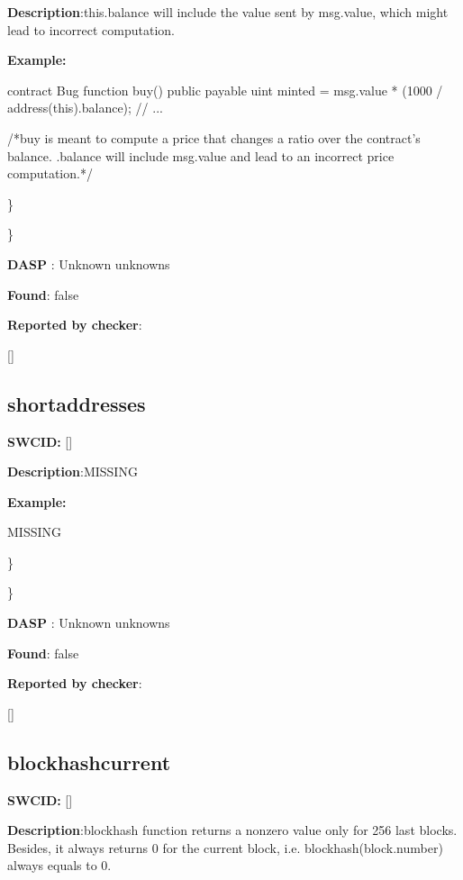 \documentclass{article}
\begin{document}
\textbf{Description}:this.balance will include the value sent by msg.value, which might lead to incorrect computation.


\textbf{Example:} 
\begin{ffcode} 

contract Bug{
  function buy() public payable{
    uint minted = msg.value * (1000 / address(this).balance);
    // ...
  }
}

 /*buy is meant to compute a price that changes a ratio over the contract's balance. .balance will include msg.value and lead to an incorrect price computation.*/ 

\end{ffcode} 
\} 

\} 

\textbf{DASP} : Unknown unknowns

\textbf{Found}: false

\textbf{Reported by checker}: 
\begin{ffcode} 

[]
\end{ffcode} 
\subsection{short{\textunderscore}addresses} 
\textbf{SWC{\textunderscore}ID:} []

\textbf{Description}:MISSING


\textbf{Example:} 
\begin{ffcode} 

MISSING

\end{ffcode} 
\} 

\} 

\textbf{DASP} : Unknown unknowns

\textbf{Found}: false

\textbf{Reported by checker}: 
\begin{ffcode} 

[]
\end{ffcode} 
\subsection{blockhash{\textunderscore}current} 
\textbf{SWC{\textunderscore}ID:} []

\textbf{Description}:blockhash function returns a non{\textendash}zero value only for 256 last blocks. Besides, it always returns 0 for the current block, i.e. blockhash(block.number) always equals to 0.
\end{document}
